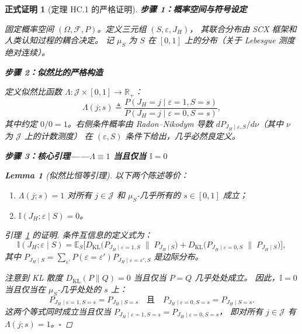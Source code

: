 \documentclass[12pt,a4paper]{article}
\newtheorem{lemma}[theorem]{Lemma}
\newtheorem{formalproof}[theorem]{正式证明}
\newcommand{\R}{\mathbb{R}}
\newcommand{\E}{\mathbb{E}}
\newcommand{\I}{\mathbb{I}}
\newcommand{\cF}{\mathcal{F}}
\newcommand{\cJ}{\mathcal{J}}
\newcommand{\KL}{D_{\mathrm{KL}}}
\begin{document}
\begin{formalproof}[定理 HC.1 的严格证明]

\textbf{步骤 1：概率空间与符号设定}

固定概率空间 $(\Omega, \cF, P)$。定义三元组 $(S, \varepsilon, J_H)$，
其联合分布由 SCX 框架和人类认知过程的耦合决定。
记 $\mu_S$ 为 $S$ 在 $[0,1]$ 上的分布（关于 Lebesgue 测度绝对连续）。

\textbf{步骤 2：似然比的严格构造}

定义似然比函数 $\Lambda: \cJ \times [0,1] \to \R_+$：
\begin{equation}\label{eq:LR-def}
    \Lambda(j; s) \triangleq
    \frac{P(J_H = j \mid \varepsilon=1, S=s)}
         {P(J_H = j \mid \varepsilon=0, S=s)},
\end{equation}
其中约定 $0/0 = 1$。右侧条件概率由 Radon--Nikodym 导数
$dP_{J_H \mid \varepsilon, S} / d\nu$（其中 $\nu$ 为 $\cJ$ 上的计数测度）
在 $(\varepsilon, S)$ 条件下给出，几乎必然良定义。

\textbf{步骤 3：核心引理——$\Lambda \equiv 1$ 当且仅当 $\I = 0$}

\begin{lemma}[似然比恒等引理]
\label{lem:LR-identity}
以下两个陈述等价：
\begin{enumerate}
    \item $\Lambda(j; s) = 1$ 对所有 $j \in \cJ$ 和 $\mu_S$-几乎所有的 $s \in [0,1]$ 成立；
    \item $\I(J_H; \varepsilon \mid S) = 0$。
\end{enumerate}
\end{lemma}

\begin{proof}[引理~\ref{lem:LR-identity} 的证明]
条件互信息的定义式为：
\begin{equation}
    \I(J_H; \varepsilon \mid S) =
    \E_{S}\Big[ \KL\big( P_{J_H \mid \varepsilon=1, S} \;\|\; P_{J_H \mid S} \big)
            + \KL\big( P_{J_H \mid \varepsilon=0, S} \;\|\; P_{J_H \mid S} \big) \Big],
\end{equation}
其中 $P_{J_H \mid S} = \sum_{\varepsilon'} P(\varepsilon=\varepsilon') P_{J_H \mid \varepsilon=\varepsilon', S}$
是边际分布。

注意到 KL 散度 $\KL(P \| Q) = 0$ 当且仅当 $P = Q$ 几乎处处成立。
因此，$\I = 0$ 当且仅当在 $\mu_S$-几乎处处的 $s$ 上：
\begin{equation}
    P_{J_H \mid \varepsilon=1, S=s} = P_{J_H \mid S=s}
    \quad\text{且}\quad
    P_{J_H \mid \varepsilon=0, S=s} = P_{J_H \mid S=s}.
\end{equation}
这两个等式同时成立当且仅当
$P_{J_H \mid \varepsilon=1, S=s} = P_{J_H \mid \varepsilon=0, S=s}$，
即对所有 $j \in \cJ$ 有 $\Lambda(j;s) = 1$。$\square$
\end{proof}


\end{formalproof}
\end{document}
